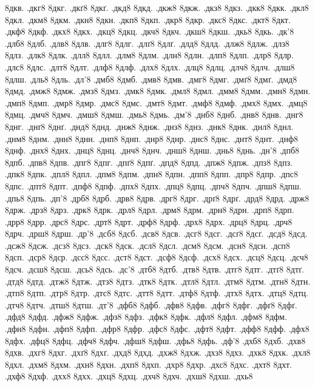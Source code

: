 {8дкв.
.дкг8
8дкг.
.дкґ8
8дкґ.
.дкд8
8дкд.
.дкж8
8дкж.
.дкз8
8дкз.
.дкк8
8дкк.
.дкл8
8дкл.
.дкм8
8дкм.
.дкн8
8дкн.
.дкп8
8дкп.
.дкр8
8дкр.
.дкс8
8дкс.
.дкт8
8дкт.
.дкф8
8дкф.
.дкх8
8дкх.
.дкц8
8дкц.
.дкч8
8дкч.
.дкш8
8дкш.
.дкь8
8дкь.
.дк'8
.длб8
8длб.
.длв8
8длв.
.длг8
8длг.
.длґ8
8длґ.
.длд8
8длд.
.длж8
8длж.
.длз8
8длз.
.длк8
8длк.
.длл8
8длл.
.длм8
8длм.
.длн8
8длн.
.длп8
8длп.
.длр8
8длр.
.длс8
8длс.
.длт8
8длт.
.длф8
8длф.
.длх8
8длх.
.длц8
8длц.
.длч8
8длч.
.длш8
8длш.
.дль8
8дль.
.дл'8
.дмб8
8дмб.
.дмв8
8дмв.
.дмг8
8дмг.
.дмґ8
8дмґ.
.дмд8
8дмд.
.дмж8
8дмж.
.дмз8
8дмз.
.дмк8
8дмк.
.дмл8
8дмл.
.дмм8
8дмм.
.дмн8
8дмн.
.дмп8
8дмп.
.дмр8
8дмр.
.дмс8
8дмс.
.дмт8
8дмт.
.дмф8
8дмф.
.дмх8
8дмх.
.дмц8
8дмц.
.дмч8
8дмч.
.дмш8
8дмш.
.дмь8
8дмь.
.дм'8
.днб8
8днб.
.днв8
8днв.
.днг8
8днг.
.днґ8
8днґ.
.днд8
8днд.
.днж8
8днж.
.днз8
8днз.
.днк8
8днк.
.днл8
8днл.
.днм8
8днм.
.днн8
8днн.
.днп8
8днп.
.днр8
8днр.
.днс8
8днс.
.днт8
8днт.
.днф8
8днф.
.днх8
8днх.
.днц8
8днц.
.днч8
8днч.
.днш8
8днш.
.днь8
8днь.
.дн'8
.дпб8
8дпб.
.дпв8
8дпв.
.дпг8
8дпг.
.дпґ8
8дпґ.
.дпд8
8дпд.
.дпж8
8дпж.
.дпз8
8дпз.
.дпк8
8дпк.
.дпл8
8дпл.
.дпм8
8дпм.
.дпн8
8дпн.
.дпп8
8дпп.
.дпр8
8дпр.
.дпс8
8дпс.
.дпт8
8дпт.
.дпф8
8дпф.
.дпх8
8дпх.
.дпц8
8дпц.
.дпч8
8дпч.
.дпш8
8дпш.
.дпь8
8дпь.
.дп'8
.дрб8
8дрб.
.дрв8
8дрв.
.дрг8
8дрг.
.дрґ8
8дрґ.
.дрд8
8дрд.
.држ8
8држ.
.дрз8
8дрз.
.дрк8
8дрк.
.дрл8
8дрл.
.дрм8
8дрм.
.дрн8
8дрн.
.дрп8
8дрп.
.дрр8
8дрр.
.дрс8
8дрс.
.дрт8
8дрт.
.дрф8
8дрф.
.дрх8
8дрх.
.дрц8
8дрц.
.дрч8
8дрч.
.дрш8
8дрш.
.др'8
.дсб8
8дсб.
.дсв8
8дсв.
.дсг8
8дсг.
.дсґ8
8дсґ.
.дсд8
8дсд.
.дсж8
8дсж.
.дсз8
8дсз.
.дск8
8дск.
.дсл8
8дсл.
.дсм8
8дсм.
.дсн8
8дсн.
.дсп8
8дсп.
.дср8
8дср.
.дсс8
8дсс.
.дст8
8дст.
.дсф8
8дсф.
.дсх8
8дсх.
.дсц8
8дсц.
.дсч8
8дсч.
.дсш8
8дсш.
.дсь8
8дсь.
.дс'8
.дтб8
8дтб.
.дтв8
8дтв.
.дтг8
8дтг.
.дтґ8
8дтґ.
.дтд8
8дтд.
.дтж8
8дтж.
.дтз8
8дтз.
.дтк8
8дтк.
.дтл8
8дтл.
.дтм8
8дтм.
.дтн8
8дтн.
.дтп8
8дтп.
.дтр8
8дтр.
.дтс8
8дтс.
.дтт8
8дтт.
.дтф8
8дтф.
.дтх8
8дтх.
.дтц8
8дтц.
.дтч8
8дтч.
.дтш8
8дтш.
.дт'8
.дфб8
8дфб.
.дфв8
8дфв.
.дфг8
8дфг.
.дфґ8
8дфґ.
.дфд8
8дфд.
.дфж8
8дфж.
.дфз8
8дфз.
.дфк8
8дфк.
.дфл8
8дфл.
.дфм8
8дфм.
.дфн8
8дфн.
.дфп8
8дфп.
.дфр8
8дфр.
.дфс8
8дфс.
.дфт8
8дфт.
.дфф8
8дфф.
.дфх8
8дфх.
.дфц8
8дфц.
.дфч8
8дфч.
.дфш8
8дфш.
.дфь8
8дфь.
.дф'8
.дхб8
8дхб.
.дхв8
8дхв.
.дхг8
8дхг.
.дхґ8
8дхґ.
.дхд8
8дхд.
.дхж8
8дхж.
.дхз8
8дхз.
.дхк8
8дхк.
.дхл8
8дхл.
.дхм8
8дхм.
.дхн8
8дхн.
.дхп8
8дхп.
.дхр8
8дхр.
.дхс8
8дхс.
.дхт8
8дхт.
.дхф8
8дхф.
.дхх8
8дхх.
.дхц8
8дхц.
.дхч8
8дхч.
.дхш8
8дхш.
.дхь8
}
